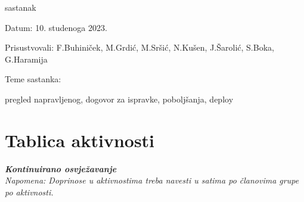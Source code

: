 \begin{packed_enum}
			
									\item  sastanak
			\item[] \begin{packed_item}
				\item Datum: 10. studenoga 2023.
				\item Prisustvovali: F.Buhiniček, M.Grdić, M.Sršić, N.Kušen, J.Šarolić, S.Boka, G.Haramija
				\item Teme sastanka:
				\begin{packed_item}
					\item  pregled napravljenog, dogovor za ispravke, poboljšanja, deploy
				\end{packed_item}
			\end{packed_item}
			
		\end{packed_enum}
		
		\eject
		\section*{Tablica aktivnosti}
		
			\textbf{\textit{Kontinuirano osvježavanje}}\\
			
			 \textit{Napomena: Doprinose u aktivnostima treba navesti u satima po članovima grupe po aktivnosti.}

